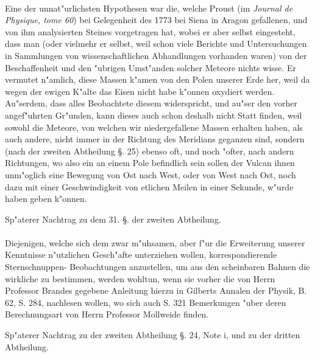 \documentclass[a4paper, 11pt, oneside, polutonikogreek, german]{article}
\begin{document}
\paragraph{}
Eine der unnat"urlichsten Hypothesen war die, welche Proust (im \emph{Journal de Physique, tome 60}) bei Gelegenheit des 1773 bei Siena in Aragon gefallenen, und von ihm analysierten Steines vorgetragen hat, wobei er aber selbst eingesteht, dass man (oder vielmehr er selbst, weil schon viele Berichte und Untersuchungen in Sammlungen von wissenschaftlichen Abhandlungen vorhanden waren) von der Beschaffenheit und den "ubrigen Umst"anden solcher Meteore nichts wisse. Er vermutet n"amlich, diese Massen k"amen von den Polen unserer Erde her, weil da wegen der ewigen K"alte das Eisen nicht habe k"onnen oxydiert werden. Au"serdem, dass alles Beobachtete diesem widerspricht, und au"ser den vorher angef"uhrten Gr"unden, kann dieses auch schon deshalb nicht Statt finden, weil sowohl die Meteore, von welchen wir niedergefallene Massen erhalten haben, als auch andere, nicht immer in der Richtung des Meridians geganzen sind, sondern (nach der zweiten Abtheilung §. 25) ebenso oft, und noch "ofter, nach andern Richtungen, wo also ein an einem Pole befindlich sein sollen der Vulcan ihnen unm"oglich eine Bewegung von Ost nach West, oder von West nach Ost, noch dazu mit einer Geschwindigkeit von etlichen Meilen in einer Sekunde, w"urde haben geben k"onnen.
\clearpage
\begin{center}
Sp"aterer Nachtrag zu dem 31. §. der zweiten Abtheilung.
\end{center}
\paragraph{}
Diejenigen, welche sich dem zwar m"uhsamen, aber f"ur die Erweiterung unserer Kenntnisse n"utzlichen Gesch"afte unterziehen wollen, korrespondierende Sternschnuppen- Beobachtungen anzustellen, um aus den scheinbaren Bahnen die wirkliche zu bestimmen, werden wohltun, wenn sie vorher die von Herrn Professor Brandes gegebene Anleitung hierzu in Gilberts Annalen der Physik, B. 62, S. 284, nachlesen wollen, wo sich auch S. 321 Bemerkungen "uber deren Berechnungsart von Herrn Professor Mollweide finden.
\begin{center}
Sp"aterer Nachtrag zu der zweiten Abtheilung §. 24, Note i, und zu der dritten Abtheilung.
\end{center}
\end{document}
